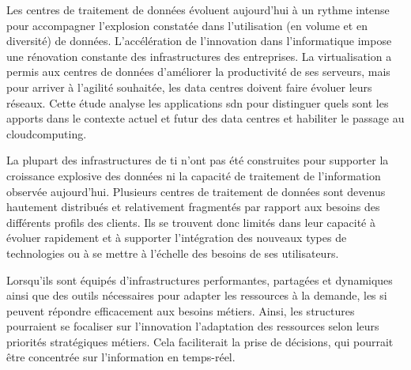 


Les centres de traitement de données évoluent aujourd'hui à un rythme intense pour accompagner l'explosion constatée dans l'utilisation (en volume et en diversité) de données. L'accélération de l'innovation dans l'informatique impose une rénovation constante des infrastructures des entreprises. La virtualisation a permis aux centres de données d'améliorer la productivité de ses serveurs, mais pour arriver à l'agilité souhaitée, les data centres doivent faire évoluer leurs réseaux. %
Cette étude analyse les applications \gls{sdn} pour distinguer quels sont les apports dans le contexte actuel et futur des data centres et habiliter le passage au \gls{cloudcomputing}.

\par 
La plupart des infrastructures de \gls{ti} n'ont pas été construites pour supporter la croissance explosive des données ni la capacité de traitement de l'information observée aujourd'hui. Plusieurs centres de traitement de données sont devenus hautement distribués et relativement fragmentés par rapport aux besoins des différents profils des clients. Ils se trouvent donc limités dans leur capacité à évoluer rapidement et à supporter l'intégration des nouveaux types de technologies ou à se mettre à l'échelle des besoins de ses utilisateurs.

\par 
Lorsqu'ils sont équipés d'infrastructures performantes, partagées et dynamiques ainsi que des outils nécessaires pour adapter les ressources à la demande, les \gls{si} peuvent répondre efficacement aux besoins métiers. Ainsi, les structures pourraient se focaliser sur l'innovation l'adaptation des ressources selon leurs priorités stratégiques métiers. Cela faciliterait la prise de décisions, qui pourrait être concentrée sur l'information en temps-réel. \cite{hpAlcatelCreatinCloudDCchallenges}


